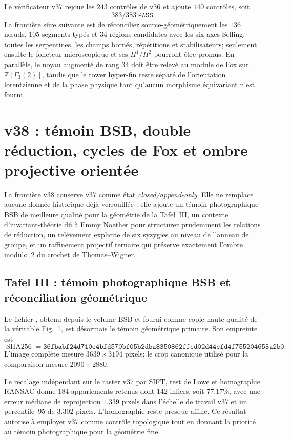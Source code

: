 \documentclass[11pt,a4paper]{article}
\newcommand{\Z}{\mathbb Z}
\begin{document}
Le vérificateur v37 rejoue les $243$ contrôles de v36 et ajoute $140$ contrôles, soit
\[
 \boxed{383/383\ \texttt{PASS}}.
\]
La frontière sûre suivante est de réconcilier source-géométriquement les $136$ nœuds, $105$ segments typés et $34$ régions candidates avec les six axes Selling, toutes les serpentines, les champs bornés, répétitions et stabilisateurs; seulement ensuite le foncteur microscopique et ses $H^1/H^2$ pourront être promus. En parallèle, le noyau augmenté de rang $34$ doit être relevé au module de Fox sur $\Z[\Gamma_3(2)]$, tandis que le tower hyper-fin reste séparé de l'orientation lorentzienne et de la phase physique tant qu'aucun morphisme équivariant n'est fourni.



\section{v38 : témoin BSB, double réduction, cycles de Fox et ombre projective orientée}\label{sec:v38-bsb-fox-projective}

La frontière v38 conserve v37 comme état \emph{closed/append-only}. Elle ne remplace aucune donnée historique déjà verrouillée : elle ajoute un témoin photographique BSB de meilleure qualité pour la géométrie de la Tafel~III, un contexte d'invariant-théorie dû à Emmy Noether pour structurer prudemment les relations de réduction, un relèvement explicite de six syzygies au niveau de l'anneau de groupe, et un raffinement projectif ternaire qui préserve exactement l'ombre modulo~$2$ du crochet de Thomas--Wigner.

\subsection{Tafel III : témoin photographique BSB et réconciliation géométrique}

Le fichier , obtenu depuis le volume BSB  et fourni comme copie haute qualité de la véritable Fig.~1, est désormais le témoin géométrique primaire. Son empreinte est
\[
 \operatorname{SHA256}=\texttt{36fbabf24d710e4bfd570bf05b2dba8350862ffcd02d44efd4f755204653a2b0}.
\]
L'image complète mesure $3639\times3194$ pixels; le crop canonique utilisé pour la comparaison mesure $2090\times2880$.

Le recalage indépendant sur le raster v37 par SIFT, test de Lowe et homographie RANSAC donne $184$ appariements retenus dont $142$ inliers, soit $77.17\%$, avec une erreur médiane de reprojection $1.339$ pixels dans l'échelle de travail v37 et un percentile~95 de $3.302$ pixels. L'homographie reste presque affine. Ce résultat autorise à employer v37 comme contrôle topologique tout en donnant la priorité au témoin photographique pour la géométrie fine.
\end{document}
